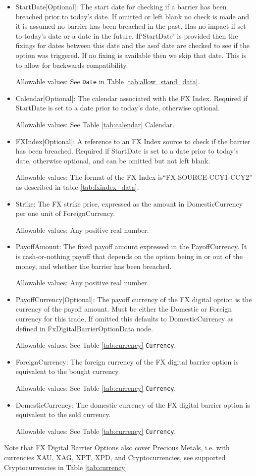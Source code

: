\begin{itemize}
\item StartDate[Optional]: The start date for checking if a barrier has been breached prior to today's date.  If omitted or left blank no check is made and it is assumed no barrier has been breached in the past. Has no impact if set to today's date or a date in the future. If`StartDate' is provided then the fixings for dates between this date and the asof date are checked to see if the option was triggered. If no fixing is available then we skip that date. This is to allow for backwards compatibility.

Allowable values:  See \lstinline!Date! in Table \ref{tab:allow_stand_data}.

\item Calendar[Optional]: The calendar associated with the FX Index. Required if StartDate is set to a date prior to today's date, otherwise optional.

Allowable values: See Table \ref{tab:calendar} Calendar.

\item FXIndex[Optional]: A reference to an FX Index source to check if the barrier has been breached. Required if StartDate is set to a date prior to today's date, otherwise optional, and can be omitted but not left blank.

Allowable values:  The format of the FX Index is``FX-SOURCE-CCY1-CCY2'' as described in table \ref{tab:fxindex_data}.  

\item Strike: The FX strike price, expressed as the amount in DomesticCurrency per one unit of ForeignCurrency. 

Allowable values:  Any positive real number.

\item PayoffAmount: The fixed payoff amount expressed in the PayoffCurrency. It is cash-or-nothing payoff that depends on the option being in or out of the money, and whether the barrier has been breached.

Allowable values:  Any positive real number.

\item PayoffCurrency[Optional]: The payoff currency of the FX digital option is the currency of the payoff amount. Must be either the Domestic or Foreign currency for this trade, If omitted this defaults to DomesticCurrency as defined in FxDigitalBarrierOptionData node.

Allowable values:  See Table \ref{tab:currency} \lstinline!Currency!.

\item ForeignCurrency: The foreign currency of the FX digital barrier option is equivalent to the bought currency.  

Allowable values:  See Table \ref{tab:currency} \lstinline!Currency!.

\item DomesticCurrency: The domestic currency of the FX digital barrier option is equivalent to the sold currency. 

Allowable values:  See Table \ref{tab:currency} \lstinline!Currency!.

\end{itemize}

Note that FX Digital Barrier Options also cover Precious Metals, i.e. with
currencies XAU, XAG, XPT, XPD, and Cryptocurrencies,  see supported Cryptocurrencies in Table \ref{tab:currency}.